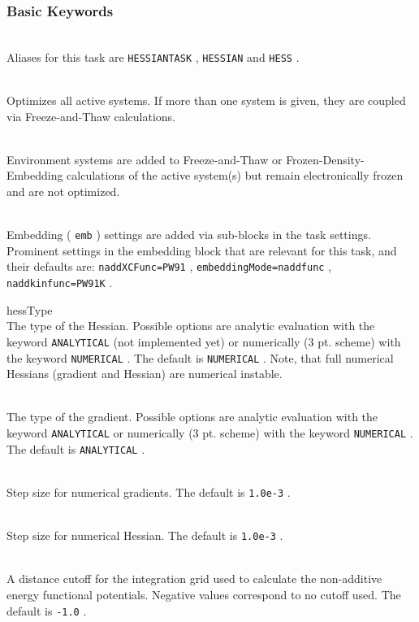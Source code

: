 \documentclass[bibliography=totocnumbered,a4paper,10pt,oneside]{scrbook}
\newcommand{\ttt}[1]{%
  \begingroup\setlength{\fboxsep}{1pt}%
  \colorbox{serenity-green!30}{\texttt{\hspace*{2pt}\vphantom{(g}#1\hspace*{2pt}}}%
  \endgroup
}
\begin{document}
\subsubsection{Basic Keywords}
\begin{description}
\item [\texttt{name}]\hfill \\
 Aliases for this task are \ttt{HESSIANTASK} , \ttt{HESSIAN} and \ttt{HESS}.
\item [\texttt{activeSystems}]\hfill \\
 Optimizes all active systems. If more than one system is given, they are coupled via Freeze-and-Thaw calculations.
\item [\texttt{environmentSystems}]\hfill \\
 Environment systems are added to Freeze-and-Thaw or Frozen-Density-Embedding calculations of the active system(s) but remain electronically frozen and are not optimized.
\item [\texttt{sub-blocks}]\hfill \\
 Embedding (\ttt{emb}) settings are added via sub-blocks in the task settings.
 Prominent settings in the embedding block that are relevant for this task, and their defaults are:
 \ttt{naddXCFunc=PW91}, \ttt{embeddingMode=naddfunc}, \ttt{naddkinfunc=PW91K}.
\item{hessType}\hfill \\
 The type of the Hessian. Possible options are analytic evaluation with the keyword \ttt{ANALYTICAL} (not implemented yet) or numerically (3 pt. scheme) with the keyword \ttt{NUMERICAL}. The default is \ttt{NUMERICAL}. Note, that full numerical Hessians (gradient and Hessian) are numerical instable. 
\item [\texttt{gradType}]\hfill \\
 The type of the gradient. Possible options are analytic evaluation with the keyword \ttt{ANALYTICAL} or numerically (3 pt. scheme) with the keyword \ttt{NUMERICAL}. The default is \ttt{ANALYTICAL}. 
\item [\texttt{numGradStepSize}]\hfill \\
 Step size for numerical gradients. The default is \ttt{1.0e-3}. 
\item [\texttt{numHessStepSize}]\hfill \\
 Step size for numerical Hessian. The default is \ttt{1.0e-3}. 
\item [\texttt{FaTgridCutOff}]\hfill \\
  A distance cutoff for the integration grid used to calculate the non-additive energy functional potentials. Negative values correspond to no cutoff used. The default is \ttt{-1.0}.

\end{description}
\end{document}
